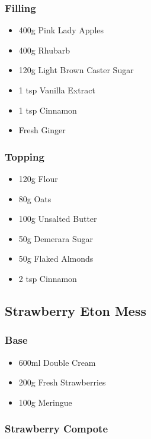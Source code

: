 \documentclass[11pt, english]{article}
\begin{document}
		\subsubsection*{Filling}

	\begin{itemize}
        \setlength\itemsep{0cm}
                \item 400g Pink Lady Apples
		\item 400g Rhubarb
		\item 120g Light Brown Caster Sugar
		\item 1 tsp Vanilla Extract
		\item 1 tsp Cinnamon
		\item Fresh Ginger
        \end{itemize}

		\subsubsection*{Topping}

	\begin{itemize}
        \setlength\itemsep{0cm}
                \item 120g Flour
		\item 80g Oats
		\item 100g Unsalted Butter
		\item 50g Demerara Sugar
		\item 50g Flaked Almonds
		\item 2 tsp Cinnamon
        \end{itemize}

\newpage

	\subsection{Strawberry Eton Mess}

		\subsubsection*{Base}

	\begin{itemize}
        \setlength\itemsep{0cm}
                \item 600ml Double Cream
		\item 200g Fresh Strawberries
		\item 100g Meringue
        \end{itemize}

		\subsubsection*{Strawberry Compote}
\end{document}
